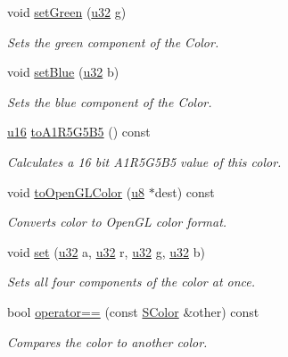 \begin{DoxyCompactItemize}
void \hyperlink{classirr_1_1video_1_1SColor_af80cfedd5e761216b8bed259963ac948}{set\+Green} (\hyperlink{namespaceirr_a0416a53257075833e7002efd0a18e804}{u32} g)
\begin{DoxyCompactList}\small\item\em Sets the green component of the Color. \end{DoxyCompactList}\item 
void \hyperlink{classirr_1_1video_1_1SColor_a13d82e6b52d32f7394f3cce041dc2965}{set\+Blue} (\hyperlink{namespaceirr_a0416a53257075833e7002efd0a18e804}{u32} b)
\begin{DoxyCompactList}\small\item\em Sets the blue component of the Color. \end{DoxyCompactList}\item 
\hyperlink{namespaceirr_ae9f8ec82692ad3b83c21f555bfa70bcc}{u16} \hyperlink{classirr_1_1video_1_1SColor_aaa60619bb953ba3fd472b0193eda558e}{to\+A1\+R5\+G5\+B5} () const
\begin{DoxyCompactList}\small\item\em Calculates a 16 bit A1\+R5\+G5\+B5 value of this color. \end{DoxyCompactList}\item 
void \hyperlink{classirr_1_1video_1_1SColor_a4251509c429bdc125660c59170b50a2e}{to\+Open\+G\+L\+Color} (\hyperlink{namespaceirr_a646874f69af8ff87fc10201b0254a761}{u8} $\ast$dest) const
\begin{DoxyCompactList}\small\item\em Converts color to Open\+GL color format. \end{DoxyCompactList}\item 
void \hyperlink{classirr_1_1video_1_1SColor_a8cf295c05c7406cc249843acbb31ec5f}{set} (\hyperlink{namespaceirr_a0416a53257075833e7002efd0a18e804}{u32} a, \hyperlink{namespaceirr_a0416a53257075833e7002efd0a18e804}{u32} r, \hyperlink{namespaceirr_a0416a53257075833e7002efd0a18e804}{u32} g, \hyperlink{namespaceirr_a0416a53257075833e7002efd0a18e804}{u32} b)
\begin{DoxyCompactList}\small\item\em Sets all four components of the color at once. \end{DoxyCompactList}\item 
bool \hyperlink{classirr_1_1video_1_1SColor_a7042c0433d4b89e6473e9f123f6b35d0}{operator==} (const \hyperlink{classirr_1_1video_1_1SColor}{S\+Color} \&other) const
\begin{DoxyCompactList}\small\item\em Compares the color to another color. \end{DoxyCompactList}\item 

\end{DoxyCompactItemize}
